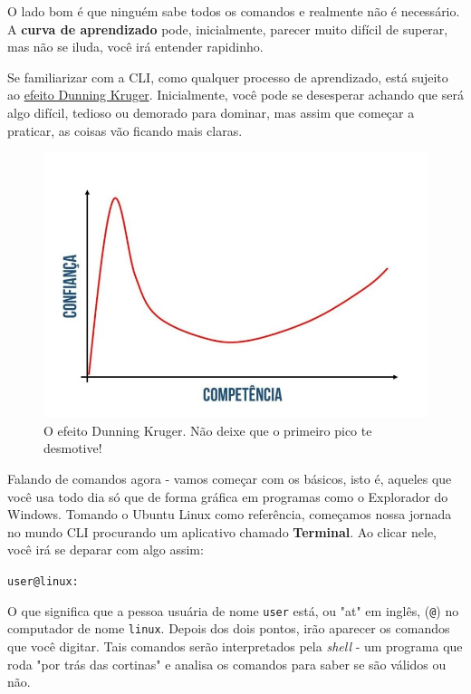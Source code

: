 \documentclass{article}
\begin{document}
	O lado bom é que ninguém sabe todos os comandos e realmente não é necessário. A \textbf{curva de aprendizado} pode, 
	inicialmente, parecer muito difícil de superar, mas não se iluda, você irá entender rapidinho. 

	Se familiarizar com a CLI, como qualquer processo de aprendizado, está sujeito ao \href{https://jornal.usp.br/radio-usp/o-que-e-o-efeito-dunning-kruger/}{efeito Dunning Kruger}. 
	Inicialmente, você pode se desesperar achando que será algo difícil, tedioso ou demorado para dominar, mas assim que
	começar a praticar, as coisas vão ficando mais claras. 

	\begin{figure}[ht!]
  		\centering
		\includegraphics[scale=0.3]{figs/dk.jpeg} 
  		\caption*{O efeito Dunning Kruger. Não deixe que o primeiro pico te desmotive!}
	\end{figure}

	\newpage
	Falando de comandos agora - vamos começar com os básicos, isto é, aqueles que você usa todo dia só que de forma gráfica
	em programas como o Explorador do Windows. Tomando o Ubuntu Linux como referência, começamos nossa jornada no mundo CLI
	procurando um aplicativo chamado \textbf{Terminal}. Ao clicar nele, você irá se deparar com algo assim: 
	
	\vspace{1ex}
	\texttt{user@linux: ~}
	\vspace{1ex}

	O que significa que a pessoa usuária de nome \texttt{user} está, ou "at" em inglês, (\texttt{@}) no computador de nome
	\texttt{linux}. Depois dos dois pontos, irão aparecer os comandos que você digitar. Tais comandos serão interpretados pela
	\textit{shell} - um programa que roda "por trás das cortinas" e analisa os comandos para saber se são válidos ou não.
\end{document}
